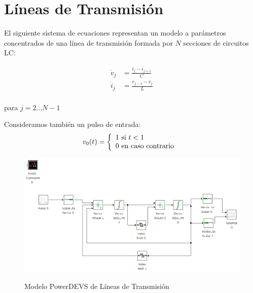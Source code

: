 \section{Líneas de Transmisión}
	El siguiente sistema de ecuaciones representan un modelo a parámetros concentrados de una línea de transmisión formada por $N$ secciones de circuitos LC:


\begin{equation*}
\begin{split}
\dot{v}_{j} &= \frac{i_{j} - i_{j+1}}{C} \\
\dot{i}_{j} &= \frac{v_{j-1} - v_{j}}{L} \\	
\end{split}
\end{equation*}

para $j = 2 \dots N-1$

Consideramos también un pulso de entrada:
\begin{equation}
v_0(t) = \left\{ 
  \begin{array}{l l}
    1 \text{ si } t < 1 \\
    0 \text{ en caso contrario }
  \end{array} \right.
\end{equation}

\begin{figure}
 \includegraphics[width=0.75\linewidth]{lclines}
\label{model:lclines}
\caption{Modelo PowerDEVS de Líneas de Transmisión}
\end{figure}

